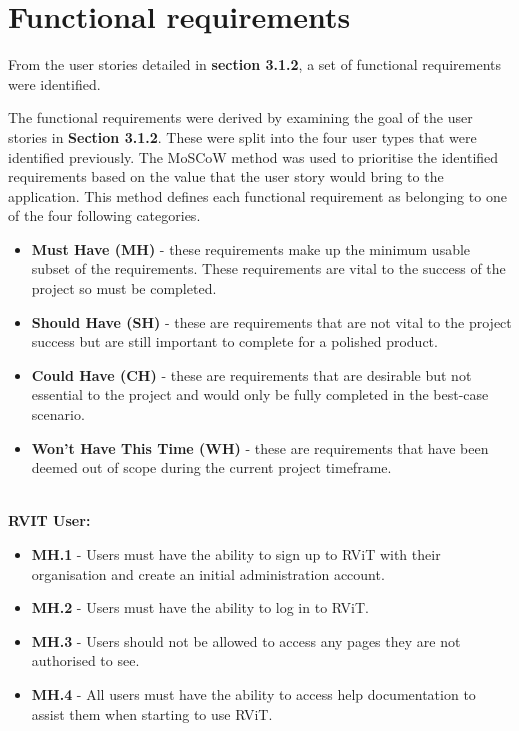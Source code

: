 \documentclass[l4proj.tex]{subfiles}
\begin{document}
\section{Functional requirements}
From the user stories detailed in \textbf{section 3.1.2}, a set of functional requirements were identified. 

The functional requirements were derived by examining the goal of the user stories in \textbf{Section 3.1.2}. These were split into the four user types that were identified previously. The MoSCoW method \cite{Consort14} was used to prioritise the identified requirements based on the value that the user story would bring to the application. This method defines each functional requirement as belonging to one of the four following categories.
\begin{itemize}
    \item \textbf{Must Have (MH)} - these requirements make up the minimum usable subset of the requirements. These requirements are vital to the success of the project so must be completed.
    \item \textbf{Should Have (SH)} - these are requirements that are not vital to the project success but are still important to complete for a polished product.
    \item \textbf{Could Have (CH)} - these are requirements that are desirable but not essential to the project and would only be fully completed in the best-case scenario. 
    \item \textbf{Won't Have This Time (WH)} - these are requirements that have been deemed out of scope during the current project timeframe.
\end{itemize}
\hfill

\hfill\\
\textbf{RVIT User:}
\begin{itemize}
    \item \textbf{MH.1} - Users must have the ability to sign up to RViT with their organisation and create an initial administration account.
    \item \textbf{MH.2} - Users must have the ability to log in to RViT.
    \item \textbf{MH.3} - Users should not be allowed to access any pages they are not authorised to see.
    \item \textbf{MH.4} - All users must have the ability to access help documentation to assist them when starting to use RViT.
\end{itemize}
\hfill
 
\end{document}
